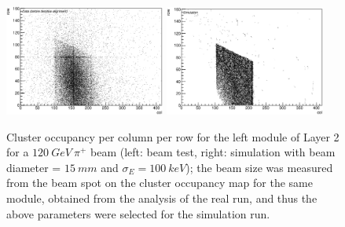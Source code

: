 \documentclass[a4paper,11pt]{article}
\begin{document}
\begin{figure}[htbp]
	\centering %
	\includegraphics[width=0.47\textwidth,origin=c,angle=0]{Cluster_occupancy_per_col_per_row_for_left_module_of_Layer_2.eps}
	\qquad
	\includegraphics[width=0.47\textwidth,origin=c,angle=0]{Cluster_occupancy_left_layer_2_simulation.eps}
	\caption{\label{fig:8} Cluster occupancy per column per row for the left module of Layer 2 for a $120\: GeV\: \pi^{+}$ beam (left: beam test, right: simulation with beam diameter = $15\: mm$ and $\sigma_{E} = 100\: keV$); the beam size was measured from the beam spot on the cluster occupancy map for the same module, obtained from the analysis of the real run, and thus the above parameters were selected for the simulation run.}
\end{figure}


\end{document}
